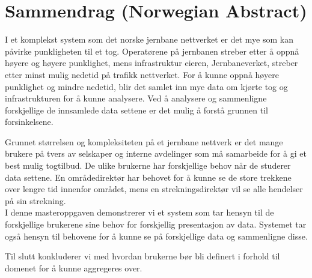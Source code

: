 \section*{Sammendrag (Norwegian Abstract)}

I et komplekst system som det norske jernbane nettverket er det mye som kan
påvirke punkligheten til et tog. Operatørene på jernbanen streber etter å oppnå
høyere og høyere punklighet, mens infrastruktur eieren, Jernbaneverket,  
streber etter minst mulig nedetid på trafikk nettverket. For å kunne oppnå 
høyere punklighet og mindre nedetid, blir det samlet inn mye data om kjørte 
tog og infrastrukturen for å kunne analysere. Ved å analysere og sammenligne forskjellige de innsamlede data settene er det mulig å forstå grunnen til forsinkelsene.

Grunnet størrelsen og kompleksiteten på et jernbane nettverk er det mange 
brukere på tvers av selskaper og interne avdelinger som må samarbeide for å gi 
et best mulig togtilbud. De ulike brukerne har forskjellige behov når de 
studerer data settene. En områdedirektør har behovet for å kunne se de store 
trekkene over lengre tid innenfor området, mens en strekningsdirektør vil se 
alle hendelser på sin strekning.\\

I denne masteroppgaven demonstrerer vi et system som tar hensyn til de
forskjellige brukerene sine behov for forskjellig presentasjon av data.
Systemet tar også hensyn til behovene for å kunne se på forskjellige data
og sammenligne disse.

Til slutt konkluderer vi med hvordan brukerne bør bli definert i forhold til
domenet for å kunne aggregeres over.
	
\clearpage
